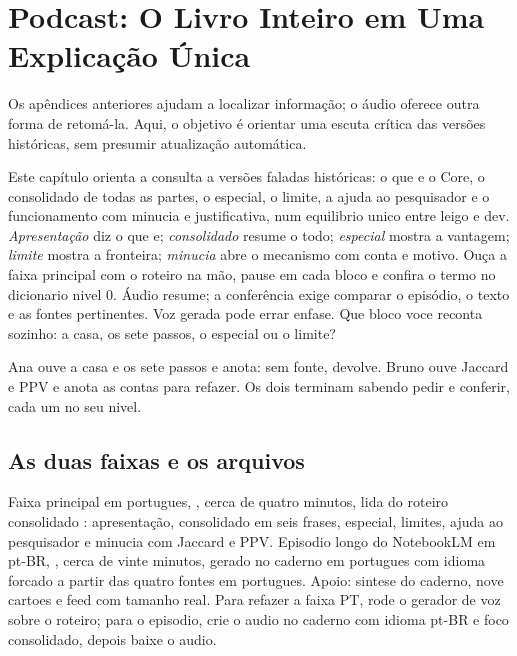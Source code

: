 \chapter{Podcast: O Livro Inteiro em Uma Explica\c{c}\~ao \'{U}nica}

Os apêndices anteriores ajudam a localizar informação; o áudio oferece outra forma de retomá-la. Aqui, o objetivo é orientar uma escuta crítica das versões históricas, sem presumir atualização automática.


\roteirodidatico
{Este capítulo orienta a consulta a versões faladas históricas: o que e o Core, o consolidado de todas as partes, o especial, o limite, a ajuda ao pesquisador e o funcionamento com minucia e justificativa, num equilibrio unico entre leigo e dev.}
{\emph{Apresenta\c{c}\~ao} diz o que e; \emph{consolidado} resume o todo; \emph{especial} mostra a vantagem; \emph{limite} mostra a fronteira; \emph{minucia} abre o mecanismo com conta e motivo.}
{Ou\c{c}a a faixa principal com o roteiro na m\~ao, pause em cada bloco e confira o termo no dicionario nivel 0.}
{Áudio resume; a conferência exige comparar o episódio, o texto e as fontes pertinentes. Voz gerada pode errar enfase.}
{Que bloco voce reconta sozinho: a casa, os sete passos, o especial ou o limite?}

{Ana ouve a casa e os sete passos e anota: sem fonte, devolve. Bruno ouve Jaccard e PPV e anota as contas para refazer. Os dois terminam sabendo pedir e conferir, cada um no seu nivel.}

\section{As duas faixas e os arquivos}


\begin{descricao}
Faixa principal em portugues, , cerca de quatro minutos, lida do roteiro consolidado : apresenta\c{c}\~ao, consolidado em seis frases, especial, limites, ajuda ao pesquisador e minucia com Jaccard e PPV. Episodio longo do NotebookLM em pt-BR, , cerca de vinte minutos, gerado no caderno em portugues com idioma forcado a partir das quatro fontes em portugues. Apoio: sintese do caderno, nove cartoes e feed com tamanho real. Para refazer a faixa PT, rode o gerador de voz sobre o roteiro; para o episodio, crie o audio no caderno com idioma pt-BR e foco consolidado, depois baixe o audio.
\end{descricao}


